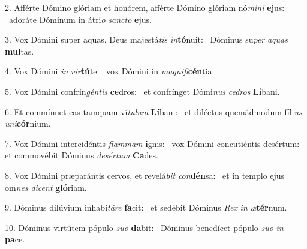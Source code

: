 2. Afférte Dómino glóriam et honórem, afférte Dómino glóriam nó\textit{mi}\textit{ni} \textbf{e}jus: \ast\  adoráte Dóminum in átri\textit{o} \textit{sanc}\textit{to} \textbf{e}jus.\

3. Vox Dómini super aquas, Deus majestá\textit{tis} \textit{in}\textbf{tó}nuit: \ast\  Dóminus su\textit{per} \textit{a}\textit{quas} \textbf{mul}tas.\

4. Vox Dómini \textit{in} \textit{vir}\textbf{tú}te: \ast\  vox Dómini in \textit{ma}\textit{gni}\textit{fi}\textbf{cén}tia.\

5. Vox Dómini confrin\textit{gén}\textit{tis} \textbf{ce}dros: \ast\  et confrínget Dómi\textit{nus} \textit{ce}\textit{dros} \textbf{Lí}bani.\

6. Et commínuet eas tamquam ví\textit{tu}\textit{lum} \textbf{Lí}bani: \ast\  et diléctus quemádmodum fíli\textit{us} \textit{u}\textit{ni}\textbf{cór}nium.\

7. Vox Dómini intercidéntis \textit{flam}\textit{mam} \textbf{i}gnis: \ast\  vox Dómini concutiéntis desértum: et commovébit Dóminus \textit{de}\textit{sér}\textit{tum} \textbf{Ca}des.\

8. Vox Dómini præparántis cervos, et revelá\textit{bit} \textit{con}\textbf{dén}sa: \ast\  et in templo ejus om\textit{nes} \textit{di}\textit{cent} \textbf{gló}riam.\

9. Dóminus dilúvium inhabi\textit{tá}\textit{re} \textbf{fa}cit: \ast\  et sedébit Dóminus \textit{Rex} \textit{in} \textit{æ}\textbf{tér}num.\

10. Dóminus virtútem pópulo \textit{su}\textit{o} \textbf{da}bit: \ast\  Dóminus benedícet pópulo \textit{su}\textit{o} \textit{in} \textbf{pa}ce.\

